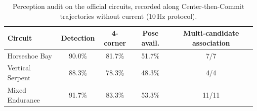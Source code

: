 \begin{table}[t]
\centering
\caption{Perception audit on the official circuits, recorded along Center-then-Commit trajectories without current ($10$\,Hz protocol).}
\label{tab:perception_audit}
\mratablestyle
\begin{tabular}{@{}lcccc@{}}
\toprule
Circuit & Detection & 4-corner & Pose avail. & Multi-candidate association \\
\midrule
Horseshoe Bay    & 90.0\% & 81.7\% & 51.7\% & 7/7 \\
Vertical Serpent & 88.3\% & 78.3\% & 48.3\% & 4/4 \\
Mixed Endurance  & 91.7\% & 83.3\% & 53.3\% & 11/11 \\
\bottomrule
\end{tabular}
\end{table}
